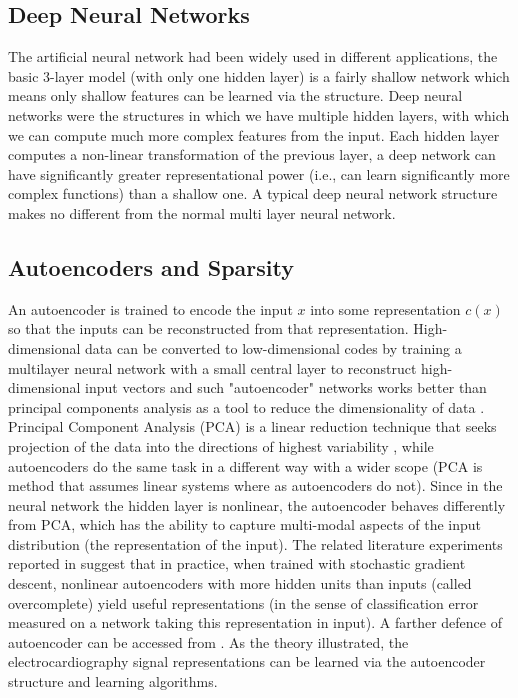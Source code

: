 \documentclass{bmcart}
\begin{document}
\subsection*{Deep Neural Networks}
The artificial neural network had been widely used in different applications, the basic 3-layer model (with only one hidden layer) is a fairly shallow network which means only shallow features can be learned via the structure. Deep neural networks were the structures in which we have multiple hidden layers, with which we can compute much more complex features from the input. Each hidden layer computes a non-linear transformation of the previous layer, a deep network can have significantly greater representational power (i.e., can learn significantly more complex functions) than a shallow one. A typical deep neural network structure makes no different from the normal multi layer neural network.

\subsection*{Autoencoders and Sparsity}
An autoencoder is trained to encode the input $x$ into some representation $c(x)$ so that the inputs can be reconstructed from that representation. High-dimensional data can be converted to low-dimensional codes by training a multilayer neural network with a small central layer to reconstruct high-dimensional input vectors and such "autoencoder" networks works better than principal components analysis as a tool to reduce the dimensionality of data \cite{hinton2006reducing}. Principal Component Analysis (PCA) is a linear reduction technique that seeks projection of the data into the directions of highest variability \cite{duda2012pattern}, while autoencoders do the same task in a different way with a wider scope (PCA is method that assumes linear systems where as autoencoders do not). Since in the neural network the hidden layer is nonlinear, the autoencoder behaves differently from PCA, which has the ability to capture multi-modal aspects of the input distribution (the representation of the input). The related literature experiments reported in \cite{bengio2007greedy} suggest that in practice, when trained with stochastic gradient descent, nonlinear autoencoders with more hidden units than inputs (called overcomplete) yield useful representations (in the sense of classification error measured on a network taking this representation in input). A farther defence of autoencoder can be accessed from \cite{bengio2009learning}. As the theory illustrated, the electrocardiography signal representations can be learned via the autoencoder structure and learning algorithms.
\end{document}
